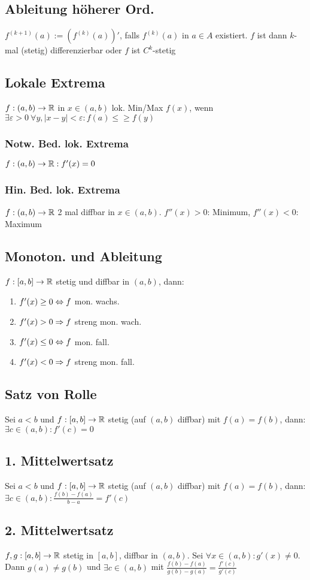 \subsection*{Ableitung höherer Ord.}
$f^{(k + 1)}(a) := \left(f^{(k)}(a)\right)'$, falls $f^{(k)}(a)$ in $a \in A$ existiert. $f$ ist dann $k$-mal (stetig) differenzierbar oder $f$ ist $C^k$-stetig
\subsection*{Lokale Extrema}
$f:(a, b) \rightarrow \mathbb R$ in $x \in  (a, b)$ lok. Min/Max $f(x)$, wenn $\exists\varepsilon > 0 \ \forall y, |x - y| < \varepsilon: f(a) \leq\geq f(y)$
\subsubsection*{Notw. Bed. lok. Extrema}
$f:(a, b) \rightarrow \mathbb R: f'(x) = 0$
\subsubsection*{Hin. Bed. lok. Extrema}
$f:(a, b) \rightarrow \mathbb R$ 2 mal diffbar in $x \in (a, b)$. $f''(x) > 0$: Minimum, $f''(x) < 0$: Maximum
\subsection*{Monoton. und Ableitung}
$f:[a,b]\rightarrow \mathbb R$ stetig und diffbar in $(a, b)$, dann:
\begin{enumerate}[label=\alph*., noitemsep]
    \item $f'(x) \geq 0 \Leftrightarrow f$ mon. wachs.
    \item $f'(x) > 0 \Rightarrow f$ streng mon. wach.
    \item $f'(x) \leq 0 \Leftrightarrow f$ mon. fall.
    \item $f'(x) < 0 \Rightarrow f$ streng mon. fall.
\end{enumerate}
\subsection*{Satz von Rolle}
Sei $a < b$ und $f:[a, b] \rightarrow \mathbb R$ stetig (auf $(a, b)$ diffbar) mit $f(a) = f(b)$, dann: $\exists c \in (a, b): f'(c) = 0$
\subsection*{1. Mittelwertsatz}
Sei $a < b$ und $f:[a, b] \rightarrow \mathbb R$ stetig (auf $(a, b)$ diffbar) mit $f(a) = f(b)$, dann: $\exists c \in (a, b): \frac{f(b) - f(a)}{b - a} = f'(c)$
\subsection*{2. Mittelwertsatz}
$f, g: [a, b]\rightarrow \mathbb R$ stetig in $[a, b]$, diffbar in $(a, b)$. Sei $\forall x \in (a, b): g'(x)\neq 0$. Dann $g(a) \neq g(b)$ und $\exists c \in (a, b)$ mit $\frac{f(b) - f(a)}{g(b) - g(a)} = \frac{f'(c)}{g'(c)}$
